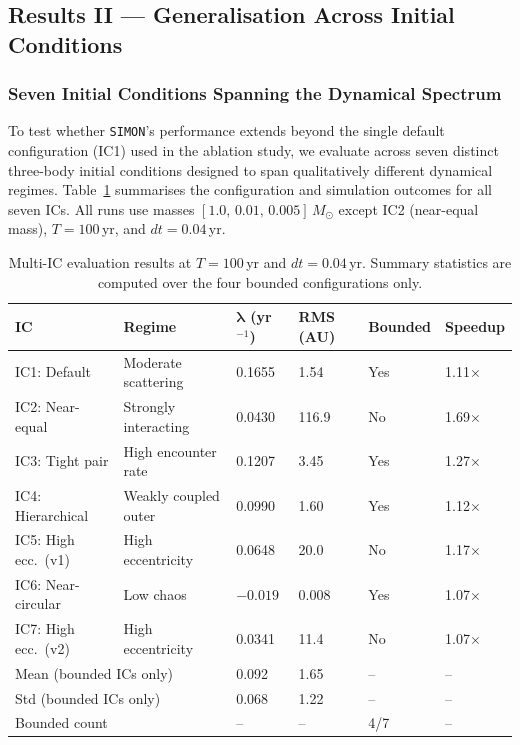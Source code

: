 \documentclass[12pt]{article}
\begin{document}

\subsection{Results II --- Generalisation Across Initial Conditions}
\label{sec:generalisation}

\subsubsection{Seven Initial Conditions Spanning the Dynamical Spectrum}

To test whether \texttt{SIMON}'s performance extends beyond the single default
configuration (IC1) used in the ablation study, we evaluate across seven distinct
three-body initial conditions designed to span qualitatively different dynamical
regimes. Table~\ref{tab:multi_ic} summarises the configuration and simulation outcomes
for all seven ICs. All runs use masses $[1.0,\,0.01,\,0.005]\,M_\odot$ except IC2
(near-equal mass), $T = 100$\,yr, and $dt = 0.04$\,yr.

\begin{table}[H]
\centering
\caption{Multi-IC evaluation results at $T=100$\,yr and $dt=0.04$\,yr. Summary statistics are computed over the four bounded configurations only.}
\label{tab:multi_ic}
\begin{tabular}{@{}llllll@{}}
\toprule
\textbf{IC} & \textbf{Regime} & $\boldsymbol{\lambda}$ (yr$^{-1}$) & \textbf{RMS (AU)} & \textbf{Bounded} & \textbf{Speedup} \\
\midrule
IC1: Default & Moderate scattering & 0.1655 & 1.54 & Yes & 1.11$\times$ \\
IC2: Near-equal & Strongly interacting & 0.0430 & 116.9 & No & 1.69$\times$ \\
IC3: Tight pair & High encounter rate & 0.1207 & 3.45 & Yes & 1.27$\times$ \\
IC4: Hierarchical & Weakly coupled outer & 0.0990 & 1.60 & Yes & 1.12$\times$ \\
IC5: High ecc.\ (v1) & High eccentricity & 0.0648 & 20.0 & No & 1.17$\times$ \\
IC6: Near-circular & Low chaos & $-0.019$ & 0.008 & Yes & 1.07$\times$ \\
IC7: High ecc.\ (v2) & High eccentricity & 0.0341 & 11.4 & No & 1.07$\times$ \\
\midrule
\multicolumn{2}{l}{Mean (bounded ICs only)} & 0.092 & 1.65 & -- & -- \\
\multicolumn{2}{l}{Std (bounded ICs only)} & 0.068 & 1.22 & -- & -- \\
\multicolumn{2}{l}{Bounded count} & -- & -- & 4/7 & -- \\
\bottomrule
\end{tabular}
\end{table}
\end{document}
